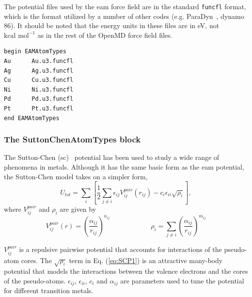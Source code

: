 \documentclass[]{book}
\begin{document}
The potential files used by the {\sc eam} force field are in the
standard {\tt funcfl} format, which is the format utilized by a number
of other codes (e.g. ParaDyn~\cite{Paradyn}, {\sc dynamo 86}).  It
should be noted that the energy units in these files are in eV, not
$\mbox{kcal mol}^{-1}$ as in the rest of the {\sc OpenMD} force field
files.  

\begin{lstlisting}[caption={[An example of a EAMAtomTypes block.] A
simple example of a EAMAtomTypes block. Here the only data provided is
the name of a {\tt funcfl} file which contains the raw data for spline
interpolations for the density, functional, and pair potential.},
label={sch:EAMAtomTypes}]
begin EAMAtomTypes
Au      Au.u3.funcfl
Ag      Ag.u3.funcfl
Cu      Cu.u3.funcfl
Ni      Ni.u3.funcfl
Pd      Pd.u3.funcfl
Pt      Pt.u3.funcfl
end EAMAtomTypes
\end{lstlisting}


\subsubsection{\label{section:ffSC}The SuttonChenAtomTypes block}

The Sutton-Chen ({\sc sc})~\cite{Chen90} potential has been used to
study a wide range of phenomena in metals.  Although it has the same
basic form as the {\sc eam} potential, the Sutton-Chen model takes on
a simpler form,
\begin{equation}
\label{eq:SCP1}
U_{tot}=\sum _{i}\left[ \frac{1}{2}\sum _{j\neq
i}\epsilon_{ij}V^{pair}_{ij}(r_{ij})-c_{i}\epsilon_{ii}\sqrt{\rho_{i}}\right] ,
\end{equation}
 where $V^{pair}_{ij}$ and $\rho_{i}$ are given by 
\begin{equation}
\label{eq:SCP2}
V^{pair}_{ij}(r)=\left(
\frac{\alpha_{ij}}{r_{ij}}\right)^{n_{ij}} \hspace{1in} \rho_{i}=\sum_{j\neq i}\left(
\frac{\alpha_{ij}}{r_{ij}}\right) ^{m_{ij}}
\end{equation}

$V^{pair}_{ij}$ is a repulsive pairwise potential that accounts for
interactions of the pseudo-atom cores.  The $\sqrt{\rho_i}$ term in
Eq. (\ref{eq:SCP1}) is an attractive many-body potential that models
the interactions between the valence electrons and the cores of the
pseudo-atoms.  $\epsilon_{ij}$, $\epsilon_{ii}$, $c_i$ and
$\alpha_{ij}$ are parameters used to tune the potential for different
transition metals.
\end{document}
